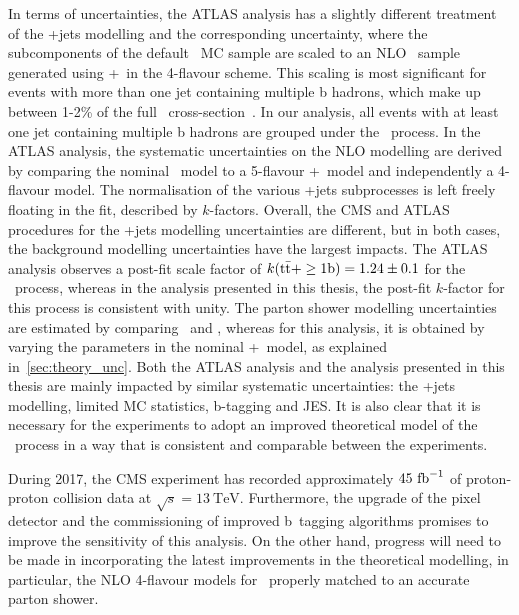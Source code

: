 In terms of uncertainties, the ATLAS analysis has a slightly different treatment of the \ttbar+jets modelling and the corresponding uncertainty, where the subcomponents of the default \powheg~MC sample are scaled to an NLO \ttbb~sample generated using \sherpa+\openloops~in the 4-flavour scheme. This scaling is most significant for events with more than one jet containing multiple b hadrons, which make up between 1-2\% of the full \ttbb~cross-section~\cite{ATLAS:2017nkr}. In our analysis, all events with at least one jet containing multiple b hadrons are grouped under the \tttwob~process. In the ATLAS analysis, the systematic uncertainties on the NLO modelling are derived by comparing the nominal \powheg~model to a 5-flavour \sherpa+\openloops~model and independently a 4-flavour model. The normalisation of the various \ttbar+jets subprocesses is left freely floating in the fit, described by $k$-factors. Overall, the CMS and ATLAS procedures for the \ttbar+jets modelling uncertainties are different, but in both cases, the background modelling uncertainties have the largest impacts. The ATLAS analysis observes a post-fit scale factor of $k(\mathrm{t} \bar{\mathrm{t}}+\geq\mathrm{1b}) = 1.24 \pm 0.1$ for the \ttbb~process, whereas in the analysis presented in this thesis, the post-fit $k$-factor for this process is consistent with unity. The parton shower modelling uncertainties are estimated by comparing \herwig~and \pythia, whereas for this analysis, it is obtained by varying the parameters in the nominal \powheg+\pythia~model, as explained in~\cref{sec:theory_unc}. Both the ATLAS analysis and the analysis presented in this thesis are mainly impacted by similar systematic uncertainties: the \ttbar+jets modelling, limited MC statistics, b-tagging and JES. It is also clear that it is necessary for the experiments to adopt an improved theoretical model of the \ttbb~process in a way that is consistent and comparable between the experiments.

During 2017, the CMS experiment has recorded approximately $45~\mathrm{fb}^{-1}$ of proton-proton collision data at $\sqrt{s}=13~\mathrm{TeV}$. Furthermore, the upgrade of the pixel detector and the commissioning of improved b~tagging algorithms promises to improve the sensitivity of this analysis. On the other hand, progress will need to be made in incorporating the latest improvements in the theoretical modelling, in particular, the NLO 4-flavour models for \ttbb~properly matched to an accurate parton shower.

